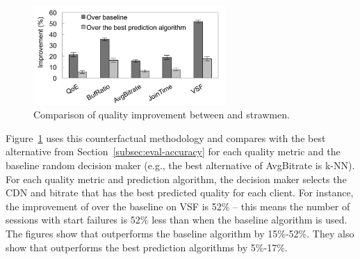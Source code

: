 \begin{figure}[t!]
\centering
\includegraphics[width=0.65\textwidth]{figures/cfa-CF-IMPROVEMENT-Perc-Grouped.pdf}
\caption{Comparison of quality improvement 
between \dda and strawmen.}
\label{fig:trace-driven-improvement}
\end{figure}


Figure~\ref{fig:trace-driven-improvement} uses this 
counterfactual methodology and compares \dda with the 
best alternative from Section~\ref{subsec:eval-accuracy} for 
each quality metric and the baseline random decision 
maker (e.g., the best alternative of AvgBitrate is k-NN). 
For each quality metric and prediction algorithm, the 
decision maker selects the CDN and bitrate that has 
the  best predicted quality for each client. 
For instance, the improvement of \dda over the baseline 
on VSF is 52\% -- this means the number of sessions 
with start failures is 52\% less than when the baseline 
algorithm is used.
The figures show that \dda outperforms the baseline 
algorithm by 15\%-52\%. 
They also show that \dda outperforms the best prediction 
algorithms by 5\%-17\%. %



